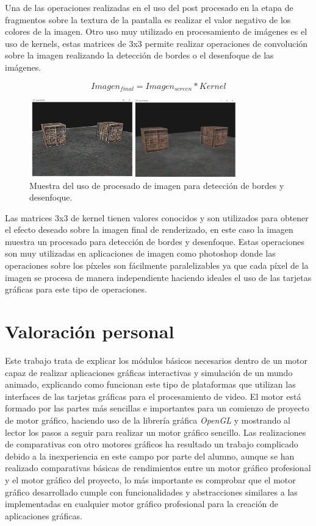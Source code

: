 \documentclass[a4paper]{book}
\begin{document}
Una de las operaciones realizadas en el uso del post procesado en la etapa de fragmentos sobre la textura de la pantalla
es realizar el valor negativo de los colores de la imagen. Otro uso muy utilizado en procesamiento de imágenes es el uso
de kernels, estas matrices de 3x3 permite realizar operaciones de convolución sobre la imagen realizando la detección de
bordes o el desenfoque de las imágenes.

\begin{equation} \label{distance}
    Imagen_{final} = Imagen_{screen} * Kernel
\end{equation}

\begin{figure}[H]
    \centering
    \includegraphics[width=9cm, keepaspectratio]{img/PostProcessing.png}
    \caption{Muestra del uso de procesado de imagen para detección de bordes y desenfoque.}
    \label{PostProcessing}
\end{figure}

Las matrices 3x3 de kernel tienen valores conocidos y son utilizados para obtener el efecto deseado sobre la imagen final
de renderizado, en este caso la imagen muestra un procesado para detección de bordes y desenfoque. Estas operaciones son
muy utilizadas en aplicaciones de imagen como photoshop donde las operaciones sobre los píxeles son fácilmente paralelizables
ya que cada píxel de la imagen se procesa de manera independiente haciendo ideales el uso de las tarjetas gráficas para este
tipo de operaciones.


\section{Valoración personal}
\label{sec:valoracion}

Este trabajo trata de explicar los módulos básicos necesarios dentro de un motor capaz de realizar aplicaciones gráficas
interactivas y simulación de un mundo animado, explicando como funcionan este tipo de plataformas que utilizan
las interfaces de las tarjetas gráficas para el procesamiento de video. El motor está formado por las partes más sencillas e
importantes para un comienzo de proyecto de motor gráfico, haciendo uso de la librería gráfica \textit{OpenGL} y mostrando al lector los
pasos a seguir para realizar un motor gráfico sencillo. Las realizaciones de comparativas con otro motores gráficos ha resultado un
trabajo complicado debido a la inexperiencia en este campo por parte del alumno, aunque se han realizado comparativas básicas de rendimientos
entre un motor gráfico profesional y el motor gráfico del proyecto, lo más importante es comprobar que el motor gráfico desarrollado
cumple con funcionalidades y abstracciones similares a las implementadas en cualquier motor gráfico profesional para la creación de 
aplicaciones gráficas.
\end{document}
